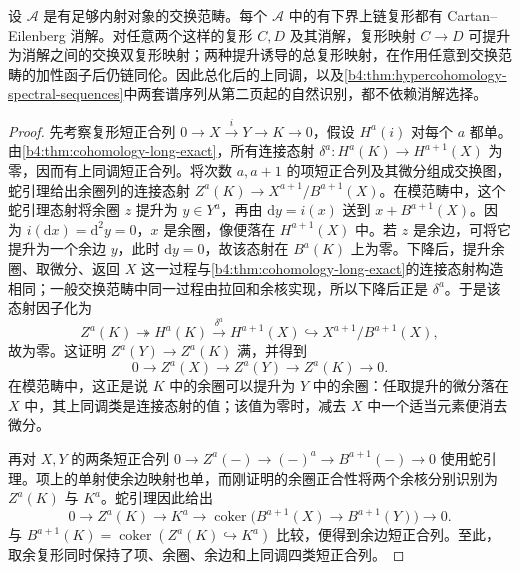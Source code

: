 \begin{theorem}\label{b4:thm:ce-resolution}
	设 \(\mathcal A\) 是有足够内射对象的交换范畴。每个 \(\mathcal A\) 中的有下界上链复形都有 Cartan--Eilenberg 消解。对任意两个这样的复形 \(C,D\) 及其消解，复形映射 \(C\to D\) 可提升为消解之间的交换双复形映射；两种提升诱导的总复形映射，在作用任意到交换范畴的加性函子后仍链同伦。因此总化后的上同调，以及\cref{b4:thm:hypercohomology-spectral-sequences}中两套谱序列从第二页起的自然识别，都不依赖消解选择。
\end{theorem}
\begin{proof}
	先考察复形短正合列 \(0\to X\xrightarrow{i}Y\to K\to0\)，假设 \(H^a(i)\) 对每个 \(a\) 都单。由\cref{b4:thm:cohomology-long-exact}，所有连接态射 \(\delta^a:H^a(K)\to H^{a+1}(X)\) 为零，因而有上同调短正合列。将次数 \(a,a+1\) 的项短正合列及其微分组成交换图，蛇引理给出余圈列的连接态射 \(Z^a(K)\to X^{a+1}/B^{a+1}(X)\)。在模范畴中，这个蛇引理态射将余圈 \(z\) 提升为 \(y\in Y^a\)，再由 \(\mathrm dy=i(x)\) 送到 \(x+B^{a+1}(X)\)。因为 \(i(\mathrm dx)=\mathrm d^2y=0\)，\(x\) 是余圈，像便落在 \(H^{a+1}(X)\) 中。若 \(z\) 是余边，可将它提升为一个余边 \(y\)，此时 \(\mathrm dy=0\)，故该态射在 \(B^a(K)\) 上为零。下降后，提升余圈、取微分、返回 \(X\) 这一过程与\cref{b4:thm:cohomology-long-exact}的连接态射构造相同；一般交换范畴中同一过程由拉回和余核实现，所以下降后正是 \(\delta^a\)。于是该态射因子化为
	\[
		Z^a(K)\twoheadrightarrow H^a(K) \xrightarrow{\delta^a}H^{a+1}(X) \hookrightarrow X^{a+1}/B^{a+1}(X),
	\]
	故为零。这证明 \(Z^a(Y)\to Z^a(K)\) 满，并得到
	\[
		0\longrightarrow Z^a(X)\longrightarrow Z^a(Y)\longrightarrow Z^a(K)\longrightarrow0.
	\]
	在模范畴中，这正是说 \(K\) 中的余圈可以提升为 \(Y\) 中的余圈：任取提升的微分落在 \(X\) 中，其上同调类是连接态射的值；该值为零时，减去 \(X\) 中一个适当元素便消去微分。

	再对 \(X,Y\) 的两条短正合列 \(0\to Z^a(-)\to(-)^a\to B^{a+1}(-)\to0\) 使用蛇引理。项上的单射使余边映射也单，而刚证明的余圈正合性将两个余核分别识别为 \(Z^a(K)\) 与 \(K^a\)。蛇引理因此给出
	\[
		0\longrightarrow Z^a(K)\longrightarrow K^a \longrightarrow\operatorname{coker}\bigl(B^{a+1}(X)\to B^{a+1}(Y)\bigr) \longrightarrow0.
	\]
	与 \(B^{a+1}(K)=\operatorname{coker}(Z^a(K)\hookrightarrow K^a)\) 比较，便得到余边短正合列。至此，取余复形同时保持了项、余圈、余边和上同调四类短正合列。


\end{proof}
